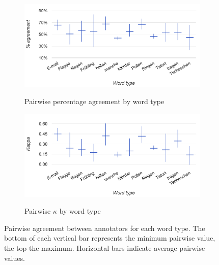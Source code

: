 		
		\begin{figure}[p]
			\centering
			
			\begin{subfigure}{\textwidth}
				\centering
				\caption{Pairwise percentage agreement by word type}
				\includegraphics[width=\textwidth]{img/annotation/pairAgreeWords-noTitle2}
				\label{fig:agreement:words:pct}
			\end{subfigure}%
			
			\vspace{1.5em}
			
			\begin{subfigure}{\textwidth}
				\centering
				\caption{Pairwise $\kappa$ by word type}
				\includegraphics[width=\textwidth]{img/annotation/pairKappaWords-noTitle2}
				\label{fig:agreement:words:k}
			\end{subfigure}%
			
			\vspace{1.5em}
			
			\caption[Pairwise agreement statistics by word type]{Pairwise agreement between annotators for each word type. 
			The bottom of each vertical bar represents the minimum pairwise value, the top the maximum. Horizontal bars indicate average pairwise values.
			}
			\label{fig:agreement:words}
		\end{figure}				
		
